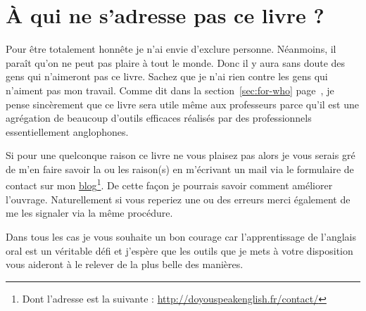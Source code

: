 \newpage

\section{À qui ne s'adresse pas ce livre ?}\label{sec:for-not-who}

Pour être totalement honnête je n'ai envie d'exclure
personne. Néanmoins, il paraît qu'on ne peut pas plaire à tout le
monde. Donc il y aura sans doute des gens qui n'aimeront pas ce
livre. Sachez que je n'ai rien contre les gens qui n'aiment pas mon
travail. Comme dit dans la section~\ref{sec:for-who}
page~\pageref{sec:for-who}, je pense sincèrement que ce livre sera
utile même aux professeurs parce qu'il est une agrégation de beaucoup
d'outils efficaces réalisés par des professionnels essentiellement
anglophones.

Si pour une quelconque raison ce livre ne vous plaisez pas alors je
vous serais gré de m'en faire savoir la ou les raison(s) en m'écrivant un mail
via le formulaire de contact sur mon \href{http://doyouspeakenglish.fr/contact/}{blog}\footnote{Dont l'adresse est
  la suivante : \url{http://doyouspeakenglish.fr/contact/}}. De cette
façon je pourrais savoir comment améliorer l'ouvrage. Naturellement si
vous reperiez une ou des erreurs merci également de me les signaler
via la même procédure.

Dans tous les cas je vous souhaite un bon courage car l'apprentissage
de l'anglais oral est un véritable défi et j'espère que les outils que
je mets à votre disposition vous aideront à le relever de la plus
belle des manières.

\begin{center}
\end{center}

\newpage
\minitoc

